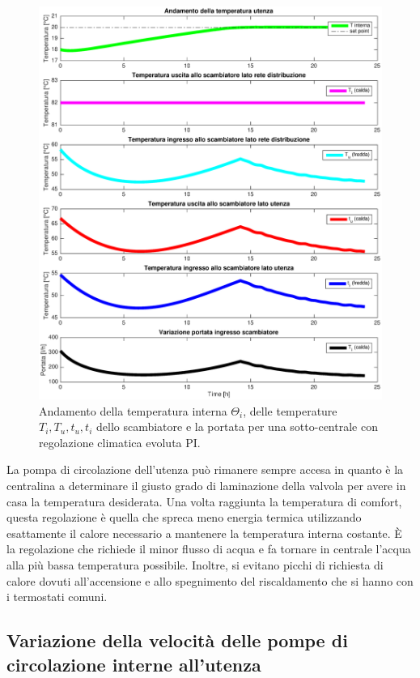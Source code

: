 \documentclass[laurea,oneside,11pt]{USiena_tesiLM}
\begin{document}
\begin{figure}[!ht]
\centering
\includegraphics[width=\textwidth]{figure/reg_PID} 
\caption{Andamento della temperatura interna $\Theta_i$, delle temperature $T_i, T_u, t_u, t_i$ dello scambiatore e la portata per una sotto-centrale con regolazione climatica evoluta PI.}
\label{fig:reg_PID}
\end{figure}

La pompa di circolazione dell'utenza può rimanere sempre accesa in quanto è la centralina a determinare il giusto grado di laminazione della valvola per avere in casa la temperatura desiderata. 
 Una volta raggiunta la temperatura di comfort, questa regolazione è quella che spreca meno energia termica utilizzando esattamente il calore necessario a mantenere la temperatura interna costante. È la regolazione che richiede il minor flusso di acqua e fa tornare in centrale l'acqua alla più bassa temperatura possibile.  Inoltre, si evitano picchi di richiesta di calore dovuti all'accensione e allo spegnimento del riscaldamento che si hanno con i termostati comuni. 


\subsection{Variazione della velocità delle pompe di circolazione interne all'utenza}
\end{document}
